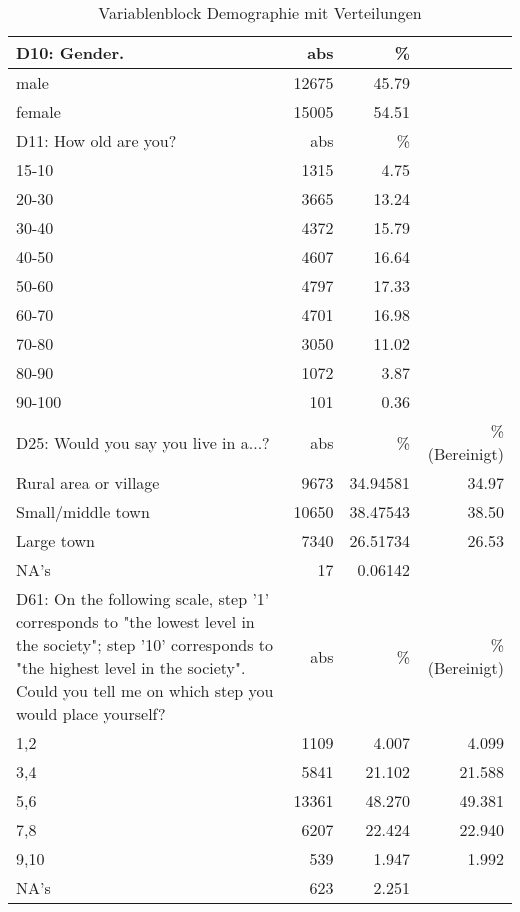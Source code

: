 \begin{table}[h]
	\begin{tabularx}{\textwidth} { b{8cm} | r | r | r}
		D10:  Gender.  & abs   & \%    \\ \hline
		male   & 12675 & 45.79 \\
		female & 15005 & 54.51 \\	\hline
		D11:  How old are you?  & abs   & \%    \\ \hline
		15-10  &  1315 &  4.75 \\
		20-30  &  3665 & 13.24 \\
		30-40  &  4372 & 15.79 \\
		40-50  &  4607 & 16.64 \\
		50-60  &  4797 & 17.33 \\
		60-70  &  4701 & 16.98 \\
		70-80  &  3050 & 11.02 \\
		80-90  &  1072 &  3.87 \\
		90-100 &   101 &  0.36 \\ \hline
		D25: Would you say you live in a...? & abs  & \% & \%(Bereinigt) \\ \hline
		Rural area or village  &    9673 & 34.94581 & 34.97 \\
		Small/middle town      &   10650 & 38.47543 & 38.50 \\
		Large town             &    7340 & 26.51734 & 26.53 \\
		NA's                   &      17 &  0.06142 &       \\ \hline
		D61: On the following scale, step '1' corresponds to "the lowest level in the society"; step '10' corresponds to "the highest level in the society". Could you tell me on which step you would place yourself? & abs  & \% & \%(Bereinigt) \\ \hline
		1,2  & 1109 &  4.007  &       4.099 \\
		3,4  & 5841 &  21.102 &       21.588 \\
		5,6  & 13361&  48.270 &       49.381 \\
		7,8  & 6207 &  22.424 &       22.940 \\
		9,10 & 539  &  1.947  &       1.992 \\
		NA's & 623  &  2.251 \\
	\end{tabularx}
	\caption{Variablenblock Demographie mit Verteilungen}
\end{table}

